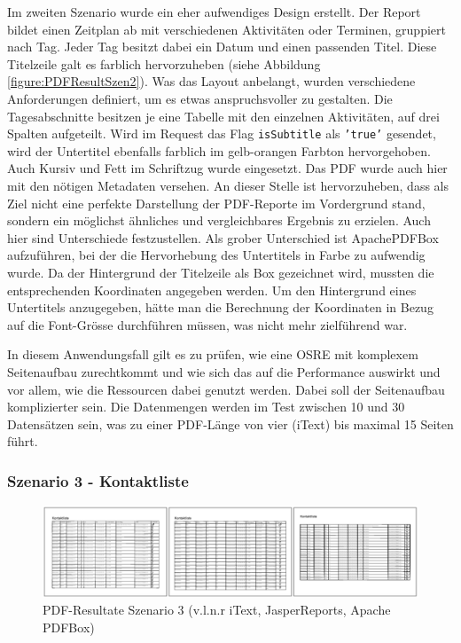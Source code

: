 \documentclass[main.tex]{subfiles}
\begin{document}
Im zweiten Szenario wurde ein eher aufwendiges Design erstellt. Der Report bildet einen Zeitplan ab mit verschiedenen Aktivitäten oder Terminen, gruppiert nach Tag. Jeder Tag besitzt dabei ein Datum und einen passenden Titel. Diese Titelzeile galt es farblich hervorzuheben (siehe Abbildung \ref{figure:PDFResultSzen2}). Was das Layout anbelangt, wurden verschiedene Anforderungen definiert, um es etwas anspruchsvoller zu gestalten. Die Tagesabschnitte besitzen je eine Tabelle mit den einzelnen Aktivitäten, auf drei Spalten aufgeteilt. Wird im Request das Flag \texttt{isSubtitle} als \texttt{'true'} gesendet, wird der Untertitel ebenfalls farblich im gelb-orangen Farbton hervorgehoben. Auch Kursiv und Fett im Schriftzug wurde eingesetzt. Das PDF wurde auch hier mit den nötigen Metadaten versehen. An dieser Stelle ist hervorzuheben, dass als Ziel nicht eine perfekte Darstellung der PDF-Reporte im Vordergrund stand, sondern ein möglichst ähnliches und vergleichbares Ergebnis zu erzielen. Auch hier sind Unterschiede festzustellen. Als grober Unterschied ist ApachePDFBox aufzuführen, bei der die Hervorhebung des Untertitels in Farbe zu aufwendig wurde. Da der Hintergrund der Titelzeile als Box gezeichnet wird, mussten die entsprechenden Koordinaten angegeben werden. Um den Hintergrund eines Untertitels anzugegeben, hätte man die Berechnung der Koordinaten in Bezug auf die Font-Grösse durchführen müssen, was nicht mehr zielführend war.

In diesem Anwendungsfall gilt es zu prüfen, wie eine OSRE mit komplexem Seitenaufbau zurechtkommt und wie sich das auf die Performance auswirkt und vor allem, wie die Ressourcen dabei genutzt werden. Dabei soll der Seitenaufbau komplizierter sein. Die Datenmengen werden im Test zwischen 10 und 30 Datensätzen sein, was zu einer PDF-Länge von vier (iText) bis maximal 15 Seiten führt.

\subsubsection{Szenario 3 - Kontaktliste}

\begin{figure}[h]
\includegraphics[width=\textwidth]{mainpart/3_methodik_evaluation_img/Szenario3PDF.PNG}
 \caption{PDF-Resultate Szenario 3 (v.l.n.r iText, JasperReports, Apache PDFBox)}
 \label{figure:PDFResultSzen3}
\end{figure}
\end{document}
